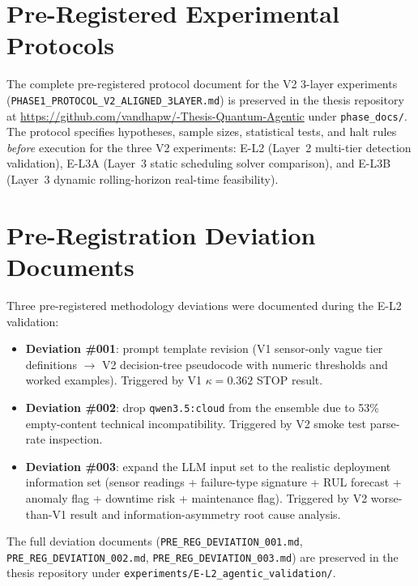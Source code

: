 \begin{appendices}

\chapter{Pre-Registered Experimental Protocols}

The complete pre-registered protocol document for the V2 3-layer experiments
(\texttt{PHASE1\_PROTOCOL\_V2\_ALIGNED\_3LAYER.md}) is preserved in the thesis
repository at \url{https://github.com/vandhapw/-Thesis-Quantum-Agentic} under
\texttt{phase\_docs/}. The protocol specifies hypotheses, sample sizes,
statistical tests, and halt rules \emph{before} execution for the three V2
experiments: E-L2 (Layer~2 multi-tier detection validation), E-L3A
(Layer~3 static scheduling solver comparison), and E-L3B (Layer~3 dynamic
rolling-horizon real-time feasibility).

\chapter{Pre-Registration Deviation Documents}

Three pre-registered methodology deviations were documented during the E-L2
validation:

\begin{itemize}
    \item \textbf{Deviation \#001}: prompt template revision (V1 sensor-only
          vague tier definitions $\to$ V2 decision-tree pseudocode with
          numeric thresholds and worked examples). Triggered by V1
          $\kappa = 0.362$ STOP result.
    \item \textbf{Deviation \#002}: drop \texttt{qwen3.5:cloud} from the
          ensemble due to 53\% empty-content technical incompatibility.
          Triggered by V2 smoke test parse-rate inspection.
    \item \textbf{Deviation \#003}: expand the LLM input set to the realistic
          deployment information set (sensor readings + failure-type
          signature + RUL forecast + anomaly flag + downtime risk +
          maintenance flag). Triggered by V2 worse-than-V1 result and
          information-asymmetry root cause analysis.
\end{itemize}

The full deviation documents (\texttt{PRE\_REG\_DEVIATION\_001.md},
\texttt{PRE\_REG\_DEVIATION\_002.md}, \texttt{PRE\_REG\_DEVIATION\_003.md})
are preserved in the thesis repository under
\texttt{experiments/E-L2\_agentic\_validation/}.


\end{appendices}
